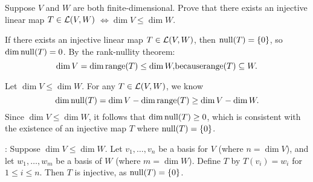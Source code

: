 \begin{xrcs}
  Suppose $V$ and $W$ are both finite-dimensional. Prove that there exists an injective linear map $T \in \mathcal{L}(V,W)$
  $
    \iff \dim V \leq \dim W.
  $
\end{xrcs}
\begin{prf}
  \Rightarrowdirection If there exists an injective linear map $T \in \mathcal{L}(V,W)$, then $\operatorname{null}(T) = \{0\}$, so $\dim \operatorname{null}(T) = 0$. By the rank-nullity theorem:
  \begin{equation}
    \dim V = \dim \myrange(T) \leq \dim W, $because$ \myrange(T) \subseteq W.
  \end{equation}

  \Leftarrowdirection Let $\dim V \leq \dim W$. For any $T \in \mathcal{L}(V,W)$, we know
  \begin{equation}
    \dim \operatorname{null}(T) = \dim V - \dim \operatorname{range}(T) \geq \dim V - \dim W.
  \end{equation}
  Since $\dim V \leq \dim W$, it follows that $\dim \operatorname{null}(T) \geq 0$, which is consistent with the existence of an injective map $T$ where $\operatorname{null}(T) = \{0\}$.

  :
  Suppose $\dim V \leq \dim W$. Let $v_1, \dots, v_n$ be a basis for $V$ (where $n = \dim V$), and let $w_1, \dots, w_m$ be a basis of $W$ (where $m = \dim W$). Define $T$ by $T(v_i) = w_i$ for $1 \leq i \leq n$. Then $T$ is injective, as $\operatorname{null}(T) = \{0\}$.
\end{prf}

